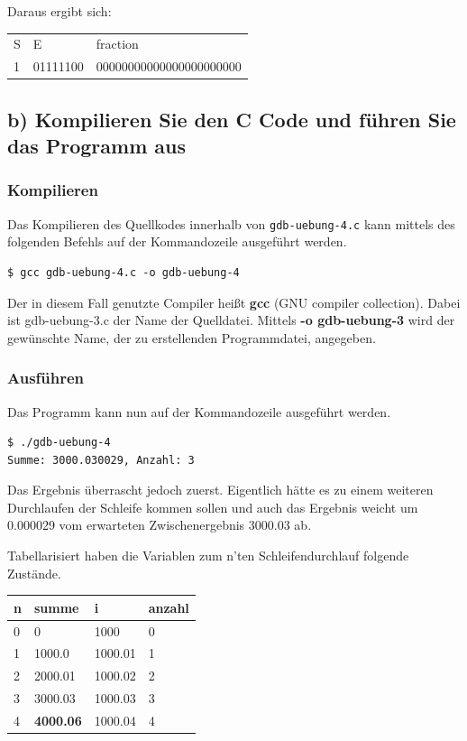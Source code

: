 \documentclass[12pt]{article}
\begin{document}
Daraus ergibt sich:
\begin{table}[H]
\begin{tabular}{l l l}
S & E & fraction \\
1 & 01111100 & 00000000000000000000000\\
\end{tabular}
\end{table}

\subsection{b) Kompilieren Sie den C Code und führen Sie das Programm aus }
\subsubsection{Kompilieren}
Das Kompilieren des Quellkodes innerhalb von \texttt{gdb-uebung-4.c} kann mittels des folgenden Befehls auf der Kommandozeile ausgeführt werden.
\begin{lstlisting}
$ gcc gdb-uebung-4.c -o gdb-uebung-4
\end{lstlisting}
Der in diesem Fall genutzte Compiler heißt \textbf{gcc} (GNU compiler collection). Dabei ist gdb-uebung-3.c der Name der Quelldatei. Mittels \textbf{-o gdb-uebung-3} wird der gewünschte Name, der zu erstellenden Programmdatei, angegeben.

\subsubsection{Ausführen}
Das Programm kann nun auf der Kommandozeile ausgeführt werden.
\begin{lstlisting}
$ ./gdb-uebung-4                    
Summe: 3000.030029, Anzahl: 3
\end{lstlisting}
Das Ergebnis überrascht jedoch zuerst. Eigentlich hätte es zu einem weiteren Durchlaufen der Schleife kommen sollen und auch das Ergebnis weicht um 0.000029 vom erwarteten Zwischenergebnis 3000.03 ab.

Tabellarisiert haben die Variablen zum n'ten Schleifendurchlauf folgende Zustände.
\begin{table}[H]
\begin{tabular}{l | l l l}
n & summe & i & anzahl \\
\hline
0 & 0 & 1000 & 0 \\
1 & 1000.0 & 1000.01 & 1 \\
2 & 2000.01 & 1000.02 & 2 \\
3 & 3000.03 & 1000.03 & 3 \\
4 & \textbf{4000.06} & 1000.04 & 4 \\
\end{tabular}
\end{table}
\end{document}
